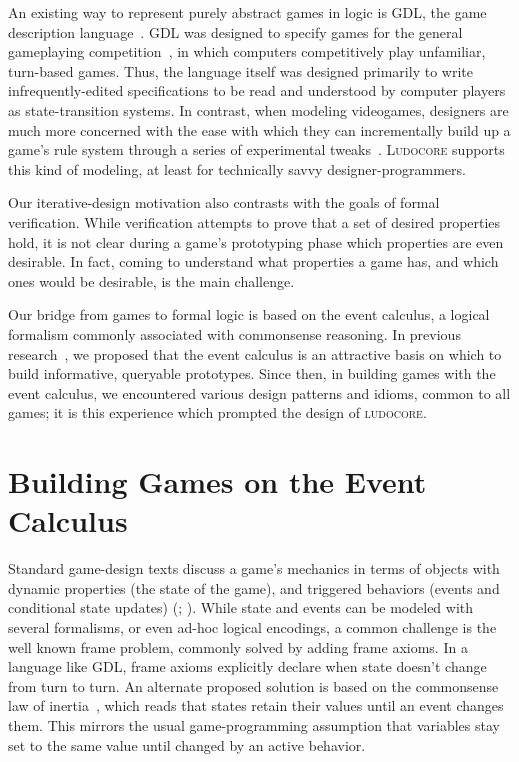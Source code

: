 \documentclass[letterpaper]{article}
\newcommand{\ludocore}{\textsc{ludocore}}
\newcommand{\Ludocore}{\textsc{Ludocore}}
\begin{document}

An existing way to represent purely abstract games in logic is GDL, the game
description language~\citep{GDL}. GDL was designed to specify games for the
general gameplaying competition~\citep{GGP}, in which computers competitively
play unfamiliar, turn-based games. Thus, the language itself was designed
primarily to write infrequently-edited specifications to be read and understood
by computer players as state-transition systems. In contrast, when modeling
videogames, designers are much more concerned with the ease with which they can
incrementally build up a game's rule system through a series of
experimental tweaks~\citep[p.\ 14]{Fullerton}. \Ludocore{} supports this
kind of modeling, at least for technically savvy designer-programmers.

Our iterative-design motivation also contrasts with the goals of formal
verification. While verification attempts to prove that a set of desired
properties hold, it is not clear during a game's prototyping phase which
properties are even desirable. In fact, coming to understand what properties a
game has, and which ones would be desirable, is the main challenge.

Our bridge from games to formal logic is based on the event calculus, a logical
formalism commonly associated with commonsense reasoning. In previous
research~\citep{AIIDE08}, we proposed that the event calculus is an attractive
basis on which to build informative, queryable prototypes. Since then, in
building games with the event calculus, we encountered various design patterns
and idioms, common to all games; it is this experience which prompted the
design of \ludocore.

\section{Building Games on the Event Calculus}

Standard game-design texts discuss a game's mechanics in terms of objects with
dynamic properties (the state of the game), and triggered behaviors (events and
conditional state updates) (\citealp[p.\ 295]{Adams}; \citealp[p.\
112]{Fullerton}).  While state and events can be modeled with several
formalisms, or even ad-hoc logical encodings, a common challenge is the well
known frame problem, commonly solved by adding frame axioms. In a language like
GDL, frame axioms explicitly declare when state doesn't change from turn to
turn.  An alternate proposed solution is based on the commonsense law of
inertia~\citep{Shanahan:inertia}, which reads that states retain their values
until an event changes them. This mirrors the usual game-programming assumption
that variables stay set to the same value until changed by an active behavior.
\end{document}
